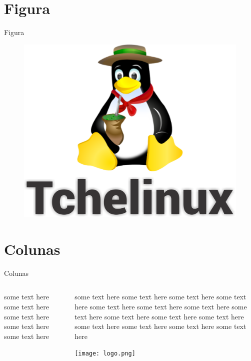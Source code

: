 \documentclass{beamer}
\begin{document}
\section{Figura}

\begin{frame}{Figura}

	\begin{figure}[!htb]
		\centering
		\includegraphics[scale=.45]{fig/fig_logo.png}
	\end{figure}

\end{frame}




\section{Colunas}
\begin{frame}{Colunas}

\begin{columns}
	\begin{column}{0.5\textwidth}
		some text here some text here some text here some text here some text here
	\end{column}
	\begin{column}{0.5\textwidth}  %
		some text here some text here some text here some text here some text here
		some text here some text here some text here some text here some text here
		some text here some text here some text here some text here some text here
		\begin{center}
			\texttt{[image: logo.png]}
		\end{center}
	\end{column}
\end{columns}

\end{frame}
\end{document}
